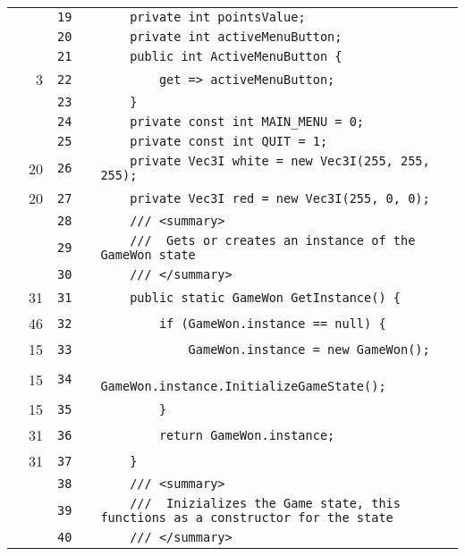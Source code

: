 \documentclass[a4paper,landscape,10pt]{article}
\begin{document}
\begin{longtable}[l]{lrrll}
\cellcolor{gray} &  & \verb~19~ & & \verb~    private int pointsValue;~\\
\cellcolor{gray} &  & \verb~20~ & & \verb~    private int activeMenuButton;~\\
\cellcolor{gray} &  & \verb~21~ & & \verb~    public int ActiveMenuButton {~\\
\cellcolor{green} & 3 & \verb~22~ & & \verb~        get => activeMenuButton;~\\
\cellcolor{gray} &  & \verb~23~ & & \verb~    }~\\
\cellcolor{gray} &  & \verb~24~ & & \verb~    private const int MAIN_MENU = 0;~\\
\cellcolor{gray} &  & \verb~25~ & & \verb~    private const int QUIT = 1;~\\
\cellcolor{green} & 20 & \verb~26~ & & \verb~    private Vec3I white = new Vec3I(255, 255, 255);~\\
\cellcolor{green} & 20 & \verb~27~ & & \verb~    private Vec3I red = new Vec3I(255, 0, 0);~\\
\cellcolor{gray} &  & \verb~28~ & & \verb~    /// <summary>~\\
\cellcolor{gray} &  & \verb~29~ & & \verb~    ///  Gets or creates an instance of the GameWon state~\\
\cellcolor{gray} &  & \verb~30~ & & \verb~    /// </summary>~\\
\cellcolor{green} & 31 & \verb~31~ & & \verb~    public static GameWon GetInstance() {~\\
\cellcolor{green} & 46 & \verb~32~ & & \verb~        if (GameWon.instance == null) {~\\
\cellcolor{green} & 15 & \verb~33~ & & \verb~            GameWon.instance = new GameWon();~\\
\cellcolor{green} & 15 & \verb~34~ & & \verb~            GameWon.instance.InitializeGameState();~\\
\cellcolor{green} & 15 & \verb~35~ & & \verb~        }~\\
\cellcolor{green} & 31 & \verb~36~ & & \verb~        return GameWon.instance;~\\
\cellcolor{green} & 31 & \verb~37~ & & \verb~    }~\\
\cellcolor{gray} &  & \verb~38~ & & \verb~    /// <summary>~\\
\cellcolor{gray} &  & \verb~39~ & & \verb~    ///  Inizializes the Game state, this functions as a constructor for the state~\\
\cellcolor{gray} &  & \verb~40~ & & \verb~    /// </summary>~\\

\end{longtable}
\end{document}
